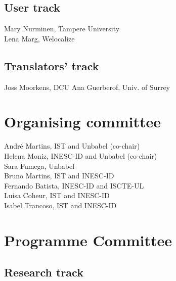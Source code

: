 \documentclass[a4paper,11pt,twoside]{book}
\begin{document}
\subsection*{User track}
\noindent Mary Nurminen, Tampere University\\
\noindent Lena Marg, Welocalize

\subsection*{Translators' track}
\noindent Joss Moorkens, DCU
\noindent Ana Guerberof, Univ. of Surrey

\section*{Organising committee}
\noindent André Martins, IST and Unbabel (co-chair)\\
\noindent Helena Moniz, INESC-ID and Unbabel (co-chair)\\
\noindent Sara Fumega, Unbabel\\
\noindent Bruno Martins, IST and INESC-ID\\
\noindent Fernando Batista, INESC-ID and ISCTE-UL\\
\noindent Luisa Coheur, IST and INESC-ID\\
\noindent Isabel Trancoso, IST and INESC-ID


\section*{Programme Committee}
\subsection*{Research track}
\end{document}
